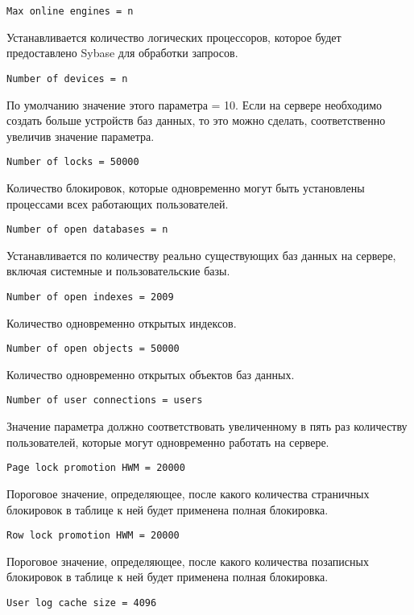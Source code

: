 \verb|Max online engines = n|

Устанавливается количество логических процессоров, которое будет предоставлено Sybase для обработки запросов.\par\bigskip

\verb|Number of devices = n|

По умолчанию значение этого параметра = 10. Если на сервере необходимо создать больше устройств баз данных, то это можно сделать, соответственно увеличив значение параметра.\par\bigskip

\verb|Number of locks = 50000|

Количество блокировок, которые одновременно могут быть установлены процессами всех работающих пользователей.\par\bigskip

\verb|Number of open databases = n|

Устанавливается по количеству реально существующих баз данных на сервере, включая системные и пользовательские базы.\par\bigskip

\verb|Number of open indexes = 2009|

Количество одновременно открытых индексов.\par\bigskip

\verb|Number of open objects = 50000|

Количество одновременно открытых объектов баз данных.\par\bigskip

\verb|Number of user connections = users|

Значение параметра должно соответствовать увеличенному в пять раз количеству пользователей, которые могут одновременно работать на сервере.\par\bigskip

\verb|Page lock promotion HWM = 20000|

Пороговое значение, определяющее, после какого количества страничных блокировок в таблице к ней будет применена полная блокировка.\par\bigskip

\verb|Row lock promotion HWM = 20000|

Пороговое значение, определяющее, после какого количества позаписных блокировок в таблице к ней будет применена полная блокировка.\par\bigskip

\verb|User log cache size = 4096|

